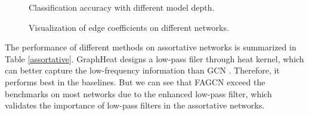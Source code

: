 \documentclass[letterpaper]{article} %
\begin{document}
\begin{figure}[t]
{    }
    \caption{Classification accuracy with different model depth.}
    \label{over-smoothing}
\end{figure}

\begin{figure}[t]
\centering
{}
\caption{Visualization of edge coefficients on different networks.}
\label{hist}
\end{figure}

The performance of different methods on assortative networks is summarized in Table \ref{assortative}. GraphHeat designs a low-pass filer through heat kernel, which can better capture the low-frequency information than GCN \cite{GraphHeat}. Therefore, it performs best in the baselines. But we can see that FAGCN exceed the benchmarks on most networks due to the enhanced low-pass filter, which validates the importance of low-pass filters in the assortative networks.
\end{document}

